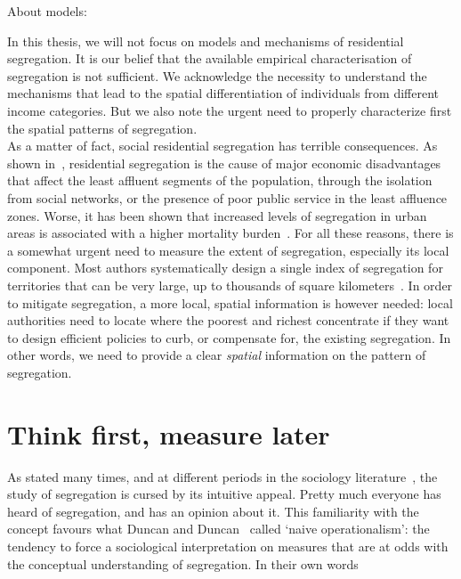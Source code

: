 About models: \cite{Gauvin:2013, Brueckner:1999, Glaeser:2008}

In this thesis, we will not focus on models and mechanisms of residential
segregation. It is our belief that the available empirical characterisation of
segregation is not sufficient. We acknowledge the necessity to
understand the mechanisms that lead to the spatial differentiation of
individuals from different income categories. But we also note the urgent need
to properly characterize first the spatial patterns of segregation.\\

As a matter of fact, social residential segregation has terrible consequences.
As shown in~\cite{Massey:1993}, residential segregation is the cause of major
economic disadvantages that affect the least affluent segments of the
population, through the isolation from social networks, or the presence of poor
public service in the least affluence zones. Worse, it has been shown that
increased levels of segregation in urban areas is associated with a higher
mortality burden~\cite{Lobmayer:2002}. For all these reasons, there is a
somewhat urgent need to measure the extent of segregation, especially its local
component. Most authors systematically design a single index of segregation for
territories that can be very large, up to thousands of square
kilometers~\cite{Apparicio:2000}. In order to mitigate segregation, a more
local, spatial information is however needed: local authorities need to locate
where the poorest and richest concentrate if they want to design efficient
policies to curb, or compensate for, the existing segregation. In other words,
we need to provide a clear {\it spatial} information on the pattern of
segregation. 



\section{Think first, measure later}
\label{sec:introduction}

As stated many times, and at different periods in the sociology
literature~\cite{Duncan:1955,James:1982,Massey:1988,Reardon:2002}, the study of
segregation is cursed by its intuitive appeal. Pretty much everyone has heard of
segregation, and has an opinion about it. This familiarity with the concept
favours what Duncan and Duncan~\cite{Duncan:1955} called `naive operationalism':
the tendency to force a sociological interpretation on measures that are at odds
with the conceptual understanding of segregation. In their own words

